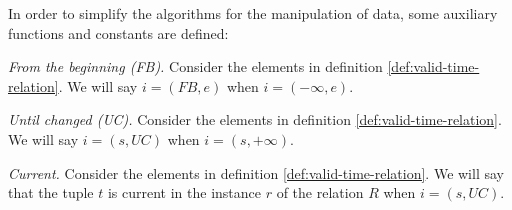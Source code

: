 % 
% 
% 
In order to simplify the algorithms for the manipulation of data, some auxiliary functions and constants are defined:


\begin{definition}
 \label{def:from-beginning}
\emph{From the beginning (FB).} 
Consider the elements in definition \ref{def:valid-time-relation}. We will say $i = \left(FB, e \right)$ when $i = \left(- \infty,e \right)$. 
\end{definition}

\begin{definition}
 \label{def:until-changed}
\emph{Until changed (UC).} 
Consider the elements in definition \ref{def:valid-time-relation}. We will say  $i = \left(s, UC \right)$ when $i = \left(s, +\infty \right)$.
\end{definition}

\begin{definition}
\emph{Current.} 
Consider the elements in definition \ref{def:valid-time-relation}. We will say that the tuple $t$ is current in the instance $r$ of the relation $R$ when $i = \left(s, UC \right)$.
\end{definition}


